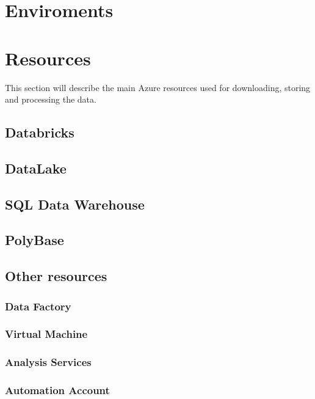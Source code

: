 \section{Enviroments}
    

\section{Resources}
    This section will describe the main Azure resources used for downloading, storing and processing the data.
    \subsection{Databricks}
        
    \subsection{DataLake}
        
    \subsection{SQL Data Warehouse}
        
    \subsection{PolyBase}
        
    \subsection{Other resources}
        \subsubsection{Data Factory}
            
        \subsubsection{Virtual Machine}
            
        \subsubsection{Analysis Services}
            
        \subsubsection{Automation Account}
            
    
